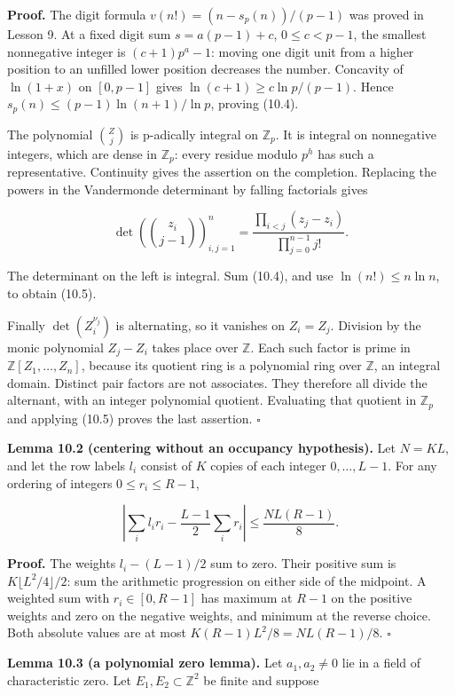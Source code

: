 \documentclass[
  11pt,
  a4paper,
]{article}
\begin{document}
\textbf{Proof.} The digit formula \(v(n!)=(n-s_p(n))/(p-1)\) was proved
in Lesson 9. At a fixed digit sum \(s=a(p-1)+c\), \(0\le c<p-1\), the
smallest nonnegative integer is \((c+1)p^a-1\): moving one digit unit
from a higher position to an unfilled lower position decreases the
number. Concavity of \(\ln(1+x)\) on \([0,p-1]\) gives
\(\ln(c+1)\ge c\ln p/(p-1)\). Hence \(s_p(n)\le(p-1)\ln(n+1)/\ln p\),
proving (10.4).

The polynomial \(\binom Zj\) is p-adically integral on \(\mathbb Z_p\).
It is integral on nonnegative integers, which are dense in
\(\mathbb Z_p\): every residue modulo \(p^h\) has such a representative.
Continuity gives the assertion on the completion. Replacing the powers
in the Vandermonde determinant by falling factorials gives

\[
\det\!\left(\binom{z_i}{j-1}\right)_{i,j=1}^n
=\frac{\prod_{i<j}(z_j-z_i)}{\prod_{j=0}^{n-1}j!}.
\]

The determinant on the left is integral. Sum (10.4), and use
\(\ln(n!)\le n\ln n\), to obtain (10.5).

Finally \(\det(Z_i^{\nu_j})\) is alternating, so it vanishes on
\(Z_i=Z_j\). Division by the monic polynomial \(Z_j-Z_i\) takes place
over \(\mathbb Z\). Each such factor is prime in
\(\mathbb Z[Z_1,\ldots,Z_n]\), because its quotient ring is a polynomial
ring over \(\mathbb Z\), an integral domain. Distinct pair factors are
not associates. They therefore all divide the alternant, with an integer
polynomial quotient. Evaluating that quotient in \(\mathbb Z_p\) and
applying (10.5) proves the last assertion. \(\square\)

\textbf{Lemma 10.2 (centering without an occupancy hypothesis).} Let
\(N=KL\), and let the row labels \(l_i\) consist of \(K\) copies of each
integer \(0,\ldots,L-1\). For any ordering of integers
\(0\le r_i\le R-1\),

\[
\left|\sum_i l_ir_i-\frac{L-1}{2}\sum_i r_i\right|
\le\frac{NL(R-1)}8.
\tag{10.6}
\]

\textbf{Proof.} The weights \(l_i-(L-1)/2\) sum to zero. Their positive
sum is \(K\lfloor L^2/4\rfloor/2\): sum the arithmetic progression on
either side of the midpoint. A weighted sum with \(r_i\in[0,R-1]\) has
maximum at \(R-1\) on the positive weights and zero on the negative
weights, and minimum at the reverse choice. Both absolute values are at
most \(K(R-1)L^2/8=NL(R-1)/8\). \(\square\)

\textbf{Lemma 10.3 (a polynomial zero lemma).} Let \(a_1,a_2\ne0\) lie
in a field of characteristic zero. Let \(E_1,E_2\subset\mathbb Z^2\) be
finite and suppose
\end{document}
